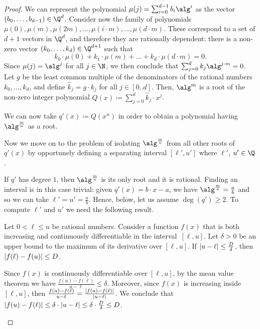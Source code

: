 \begin{proof}
  We can represent the polynomial $\mu(j) = \sum_{i=0}^{d-1} b_i \alg^i$ as the
  vector $(b_0,\dots,b_{d-1}) \in \Q^d$. Consider now the family of polynomials
  $\mu(0),\mu(m),\mu(2m),\dots,\mu(i \cdot m),\dots,\mu(d \cdot m)$. These
  correspond to a set of $d+1$ vectors in $\Q^d$, and therefore they are
  rationally dependent: there is a non-zero vector $(k_0,\dots,k_{d}) \in
  \Q^{d+1}$ such that 
  \[ 
    k_0 \cdot \mu(0) + k_1 \cdot \mu(m) + \dots + k_d \cdot \mu(d \cdot m) = 0.
  \]
  Since $\mu(j) = \alg^j$ for all $j \in \N$, we then conclude that
  $\sum_{j=0}^d k_j \alg^{j \cdot m} = 0$. Let $g$ be the least common multiple
  of the denominators of the rational numbers $k_0,\dots,k_{d}$, and define
  $\hat{k}_j = g \cdot k_j$ for all $j \in [0..d]$. Then, $\alg^m$ is a root of
  the non-zero integer polynomial $Q(x) \coloneqq \sum_{j=0}^d \hat{k}_j \cdot
  x^{j}$.

  We can now take $q'(x) \coloneqq Q(x^n)$ in order to obtain a polynomial
  having $\alg^{\frac{m}{n}}$ as a root.


  Now we move on to the problem of isolating $\alg^{\frac{m}{n}}$ from all other
  roots of $q'(x)$ by opportunely defining a separating interval $[\ell',u']$
  where $\ell'$, $u'\in\Q$.

  If $q'$ has degree $1$, then $\alg^{\frac{m}{n}}$ is its only root and it is
  rational. Finding an interval is in this case trivial: given $q'(x) = b \cdot
  x - a$, we have $\alg^{\frac{m}{n}} = \frac{a}{b}$ and so we can take $\ell' =
  u' = \frac{a}{b}$. Hence, below, let us assume $\deg(q') \geq 2$.
  To compute $\ell'$ and $u'$ we need the following result. 

  \begin{claim}
    \label{claim:mean-value}
    Let $0<\ell\leq u$ be rational numbers. Consider a function $f(x)$
    that is both increasing and continuously differentiable in the
    interval~$[\ell,u]$. Let $\delta > 0$ be an upper bound to the maximum of
    its derivative over $[\ell,u]$. If $\left|u-\ell\right|\leq \frac{D}{\delta}$, then
    $\left|f(\ell)-f(u)\right|\leq D$.
  \end{claim}
  \begin{claimproof}
    Since $f(x)$ is continuously differentiable over $[\ell,u]$, 
    by the mean value theorem we have $\frac{f(u)-f(\ell)}{u-\ell} \leq \delta$. 
    Moreover, since $f(x)$ is increasing inside $[\ell,u]$, then 
    $\frac{f(u)-f(\ell)}{u-\ell} = \frac{\left|f(u)-f(\ell)\right|}{\left|u-\ell\right|}$.
    We conclude that $\left|f(u)-f(\ell)\right|\leq \delta\cdot\left|u-\ell\right| \leq \delta \cdot  \frac{D}{\delta} \leq D$.
  \end{claimproof}


\end{proof}
